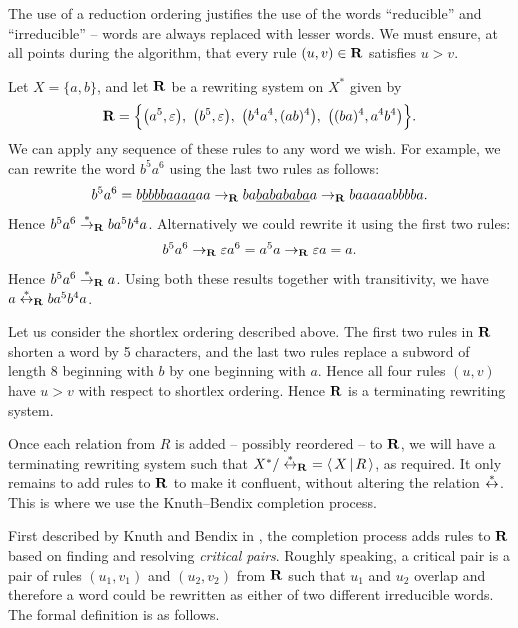The use of a reduction ordering justifies the use of the words ``reducible'' and
``irreducible'' -- words are always replaced with lesser words.  We must ensure,
at all points during the algorithm, that every rule $(u,v) \in \mathbf{R}$ satisfies
$u > v$.

\begin{example}
  \label{ex:rws}
  Let $X = \{a,b\}$, and let $\mathbf{R}$ be a rewriting system on $X^*$ given by
  $$\mathbf{R} = \Big\{
  \big(a^5, \varepsilon\big),
  \ \big(b^5, \varepsilon\big),
  \ \big(b^4a^4, (ab)^4\big),
  \ \big((ba)^4, a^4b^4\big)
  \Big\}.$$
  We can apply any sequence of these rules to any word we wish.  For example, we
  can rewrite the word $b^5a^6$ using the last two rules as follows:
  $$b^5a^6
  = b\underline{bbbbaaaa}aa
  \to_{\mathbf{R}} ba\underline{babababa}a
  \to_{\mathbf{R}} baaaaabbbba.$$
  Hence $b^5a^6 \stackrel{*}{\to}_{\mathbf{R}} ba^5b^4a$.  Alternatively we could rewrite it using
  the first two rules:
  $$b^5a^6
  \to_{\mathbf{R}} \varepsilon a^6
  = a^5a
  \to_{\mathbf{R}} \varepsilon a
  = a.$$
  Hence $b^5a^6 \stackrel{*}{\to}_{\mathbf{R}} a$.  Using both these results together with
  transitivity, we have $a \stackrel{*}{\leftrightarrow}_{\mathbf{R}} ba^5b^4a$.

  Let us consider the shortlex ordering described above.  The first two rules in
  $\mathbf{R}$ shorten a word by 5 characters, and the last two rules replace a
  subword of length 8 beginning with $b$ by one beginning with $a$.  Hence all
  four rules $(u,v)$ have $u > v$ with respect to shortlex ordering.  Hence
  $\mathbf{R}$ is a terminating rewriting system.
\end{example}

Once each relation from $R$ is added -- possibly reordered -- to $\mathbf{R}$, we
will have a terminating rewriting system such that
$X^* / \stackrel{*}{\leftrightarrow}_{\mathbf{R}}\ = \left\langle \, X \, \middle| \, R \, \right\rangle$, as required.  It only remains to add
rules to $\mathbf{R}$ to make it confluent, without altering the relation
$\stackrel{*}{\leftrightarrow}$.  This is where we use the Knuth--Bendix completion process.

First described by Knuth and Bendix in \cite{knuth_bendix}, the completion
process adds rules to $\mathbf{R}$ based on finding and resolving
\textit{critical pairs}.  Roughly speaking, a critical pair is a pair of rules $(u_1, v_1)$ and
$(u_2, v_2)$ from $\mathbf{R}$ such that $u_1$ and $u_2$ overlap and therefore a word could be
rewritten as either of two different irreducible words.  The formal definition
is as follows.

